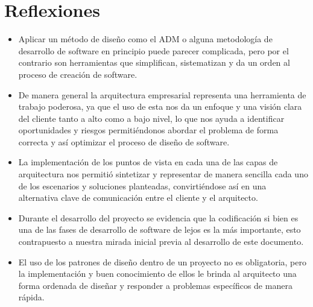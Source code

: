 \chapter{Reflexiones}

\begin{itemize}
	\item Aplicar un método de diseño como el ADM o alguna metodología de desarrollo de software en principio puede parecer complicada, pero por el contrario son herramientas que simplifican, sistematizan y da un orden al proceso de creación de software.
	\item De manera general la arquitectura empresarial representa una herramienta de trabajo poderosa, ya que el uso de esta nos da un enfoque y una visión clara del cliente tanto a alto como a bajo nivel, lo que nos ayuda a identificar oportunidades y riesgos permitiéndonos abordar el problema de forma correcta y así optimizar el proceso de diseño de software.
	\item La implementación de los puntos de vista en cada una de las capas de arquitectura nos permitió sintetizar y representar de manera sencilla cada uno de los escenarios  y soluciones planteadas, convirtiéndose así en una alternativa clave de comunicación entre el cliente y el arquitecto.
	\item Durante el desarrollo del proyecto se evidencia que la codificación si bien es una de las fases de desarrollo de software de lejos es la más importante, esto contrapuesto a nuestra mirada inicial previa al desarrollo de este documento.
	\item El uso de los patrones de diseño dentro de un proyecto no es obligatoria, pero la implementación y buen conocimiento de ellos le brinda al arquitecto una forma ordenada de diseñar y responder a problemas específicos de manera rápida.
\end{itemize}